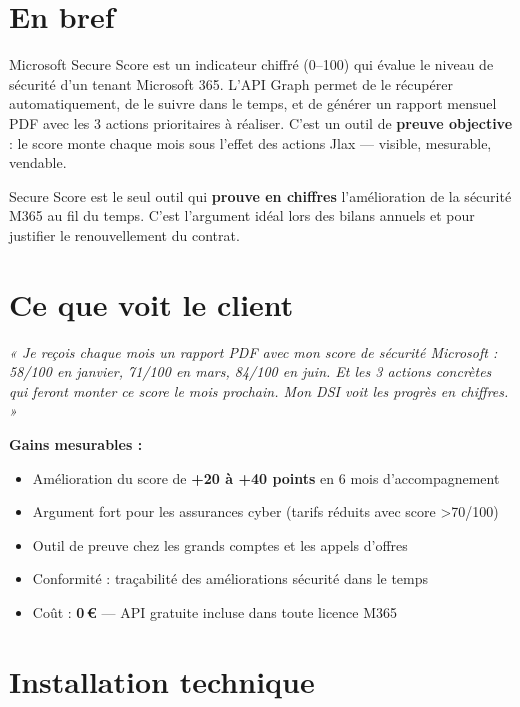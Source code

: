 \documentclass[11pt, a4paper]{article}
\begin{document}
\ficheHeader

\section*{En bref}
Microsoft Secure Score est un indicateur chiffré (0–100) qui évalue le niveau de sécurité d'un tenant Microsoft 365. L'API Graph permet de le récupérer automatiquement, de le suivre dans le temps, et de générer un rapport mensuel PDF avec les 3 actions prioritaires à réaliser. C'est un outil de \textbf{preuve objective} : le score monte chaque mois sous l'effet des actions Jlax — visible, mesurable, vendable.

\begin{pointcle}
  Secure Score est le seul outil qui \textbf{prouve en chiffres} l'amélioration de la sécurité M365 au fil du temps. C'est l'argument idéal lors des bilans annuels et pour justifier le renouvellement du contrat.
\end{pointcle}

\section{Ce que voit le client}

\begin{clientbox}
  \textit{« Je reçois chaque mois un rapport PDF avec mon score de sécurité Microsoft : 58/100 en janvier, 71/100 en mars, 84/100 en juin. Et les 3 actions concrètes qui feront monter ce score le mois prochain. Mon DSI voit les progrès en chiffres. »}
\end{clientbox}

\textbf{Gains mesurables :}
\begin{itemize}
  \item Amélioration du score de \textbf{+20 à +40 points} en 6 mois d'accompagnement
  \item Argument fort pour les assurances cyber (tarifs réduits avec score >70/100)
  \item Outil de preuve chez les grands comptes et les appels d'offres
  \item Conformité : traçabilité des améliorations sécurité dans le temps
  \item Coût : \textbf{0\,€} — API gratuite incluse dans toute licence M365
\end{itemize}

\section{Installation technique}
\end{document}
